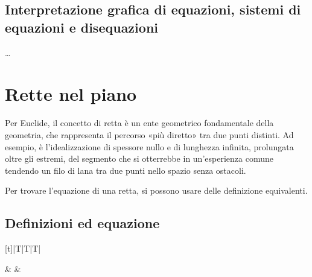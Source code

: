 \documentclass[letterpaper,10pt,italian]{jupyterBook}
\begin{document}
\subsection{Interpretazione grafica di equazioni, sistemi di equazioni e disequazioni}
\label{\detokenize{ch/analytic_geometry/analytic_geometry_2d/curves:interpretazione-grafica-di-equazioni-sistemi-di-equazioni-e-disequazioni}}
\sphinxAtStartPar
…

\sphinxstepscope


\section{Rette nel piano}
\label{\detokenize{ch/analytic_geometry/analytic_geometry_2d/lines:rette-nel-piano}}\label{\detokenize{ch/analytic_geometry/analytic_geometry_2d/lines:geometry-analytic-2d-lines}}\label{\detokenize{ch/analytic_geometry/analytic_geometry_2d/lines::doc}}
\sphinxAtStartPar
Per Euclide, il concetto di retta è un ente geometrico fondamentale della geometria, che rappresenta il percorso «più diretto» tra due punti distinti. Ad esempio, è l’idealizzazione di spessore nullo e di lunghezza infinita, prolungata oltre gli estremi, del segmento che si otterrebbe in un’esperienza comune tendendo un filo di lana tra due punti nello spazio senza ostacoli.

\sphinxAtStartPar
Per trovare l’equazione di una retta, si possono usare delle definizione equivalenti.


\subsection{Definizioni ed equazione}
\label{\detokenize{ch/analytic_geometry/analytic_geometry_2d/lines:definizioni-ed-equazione}}

\begin{savenotes}\sphinxattablestart
\centering
\begin{tabulary}{\linewidth}[t]{|T|T|T|}
\hline

\sphinxAtStartPar
{}
&
\sphinxAtStartPar
{}
&
\sphinxAtStartPar
{}
\\
\hline
\end{tabulary}
\par
\sphinxattableend\end{savenotes}
\end{document}
